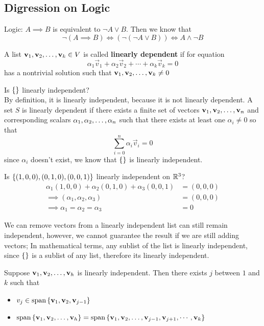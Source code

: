 \subsection*{Digression on Logic}
Logic: $A \implies B$ is equivalent to $\neg A \lor B$. Then we know that \[\neg (A \implies B) \iff (\neg(\neg A \lor B)) \iff A \land \neg B\]
\begin{definition}
    A list ${\mathbf v}_1,{\mathbf v}_2, \ldots, {\mathbf v}_{k} \in V$ is called \textbf{linearly dependent} if for equation
    \[ \alpha_1 \vec v_1 + \alpha_2 \vec v_2 + \cdots + \alpha_k \vec v_k = 0\] has a nontrivial solution such that ${\mathbf v}_1,{\mathbf v}_2, \ldots, {\mathbf v}_{k} \neq 0$
\end{definition}
\begin{example}
    Is $\left\{ \right\}$ linearly independent? \\
    By definition, it is linearly independent, because it is not linearly dependent. A set $S$ is linearly dependent if there exists a finite set of vectors ${\mathbf v}_1,{\mathbf v}_2, \ldots, {\mathbf v}_{n}$ and corresponding scalars ${\alpha}_1,{\alpha}_2, \ldots, {\alpha}_{n}$ such that there exists at least one $\alpha_i \neq 0$ so that \[ \sum_{i= 0}^n \alpha_i \vec v_i = 0\] since $\alpha_i$ doesn't exist, we know that $\left\{ \right\}$ is linearly independent.
\end{example}
\begin{example}
    Is $\left\{ (1,0,0),(0,1,0),(0,0,1)\right\}$ linearly independent on $\mathbb R^3$?
    \begin{align*}
        \alpha_1(1,0,0) + \alpha_2(0,1,0) + \alpha_3(0,0,1) &= (0,0,0) \\
        \implies (\alpha_1, \alpha_2, \alpha_3) &= (0,0,0) \\
        \implies \alpha_1 = \alpha_2 = \alpha_3 &= 0
    \end{align*}    
\end{example}
\begin{remark}
    We can remove vectors from a linearly independent list can still remain independent, however, we cannot guarantee the result if we are still adding vectors; In mathematical terms, any sublist of the list is linearly independent, since $\left\{ \right\}$ is a sublist of any list, therefore its linearly independent.
\end{remark}
\begin{lemma}
    Suppose ${\mathbf v}_1,{\mathbf v}_2, \ldots, {\mathbf v}_{h}$ is linearly independent. Then there exists $j$ between $1$ and $k$ such that 
    \begin{itemize}
        \item $v_j \in \text{span} \left\{ \mathbf v_1, \mathbf v_2, \mathbf v_{j-1} \right\}$
        \item $\text{span} \left\{ {\mathbf v}_1,{\mathbf v}_2, \ldots, {\mathbf v}_{h} \right\} = \text{span} \left\{ {\mathbf v}_1,{\mathbf v}_2, \ldots, {\mathbf v}_{j-1}, \mathbf v_{j+1} , \cdots, \mathbf v_k \right\}$
    \end{itemize}
\end{lemma}
